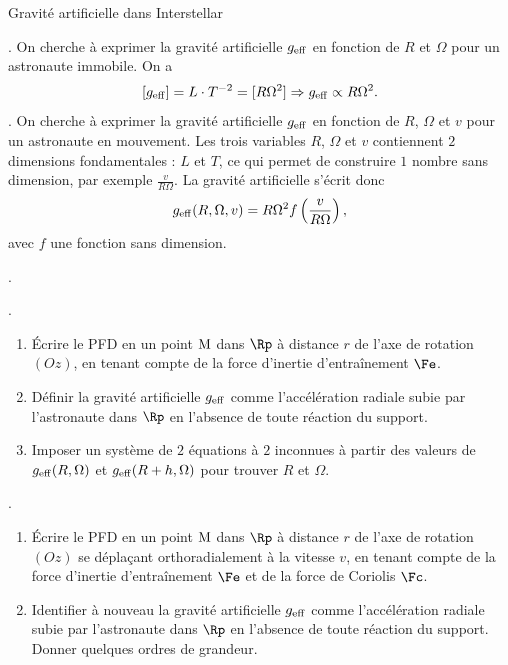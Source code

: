 \begin{exo}[PC][2][oral]{Gravité artificielle dans Interstellar}
{\begin{liste}
    . On cherche à exprimer la gravité artificielle $g_{\rm{eff}}$ en fonction de $R$ et $\Omega$ pour un astronaute immobile. On a 
    $$
    [g_{\rm{eff}}] = L\cdot T^{-2} = [R \Omega^2] \Rightarrow g_{\rm{eff}} \propto R \Omega^2.
    $$
    . On cherche à exprimer la gravité artificielle $g_{\rm{eff}}$ en fonction de $R$, $\Omega$ et $v$ pour un astronaute en mouvement. Les trois variables $R$, $\Omega$ et $v$ contiennent $2$ dimensions fondamentales : $L$ et $T$, ce qui permet de construire $1$ nombre sans dimension, par exemple $\textstyle\frac{v}{R\Omega}$. La gravité artificielle s'écrit donc
    $$
    g_{\rm{eff}}(R,\Omega,v) = R \Omega^2 f\left(\frac{v}{R\Omega}\right),
    $$
    avec $f$ une fonction sans dimension.
    \item {}. 
    
    .
    \begin{enumerate}
      \item Écrire le PFD en un point $\rm M$ dans $\Rp$ à distance $r$ de l'axe de rotation $(Oz)$, en tenant compte de la force d'inertie d'entraînement $\Fe$.
      \item Définir la gravité artificielle $g_{\rm{eff}}$ comme l'accélération radiale  subie par l'astronaute dans $\Rp$ en l'absence de toute réaction du support.
      \item Imposer un système de $2$ équations à $2$ inconnues à partir des valeurs de $g_{\rm{eff}}(R,\Omega)$ et $g_{\rm{eff}}(R+h,\Omega)$  pour trouver $R$ et $\Omega$.
    \end{enumerate}

    .
    \begin{enumerate}
      \item Écrire le PFD en un point $\rm M$ dans $\Rp$ à distance $r$ de l'axe de rotation $(Oz)$ se déplaçant orthoradialement à la vitesse $v$, en tenant compte de la force d'inertie d'entraînement $\Fe$ et de la force de Coriolis $\Fc$. 
      \item Identifier à nouveau la gravité artificielle $g_{\rm{eff}}$ comme l'accélération radiale subie par l'astronaute dans $\Rp$ en l'absence de toute réaction du support.  Donner quelques ordres de grandeur.
    \end{enumerate}
  \end{liste}
}


\end{exo}
